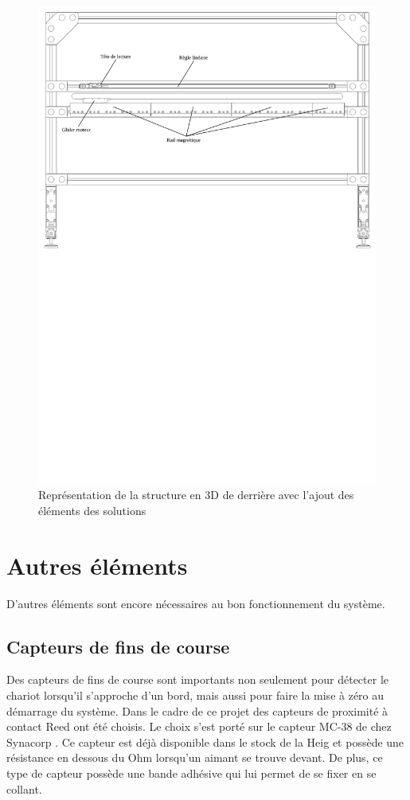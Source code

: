 \begin{figure}[H]
    \centering
    \includegraphics[width = \textwidth]{assets/figures/VueDerriere.svg}
    \caption{Représentation de la structure en 3D de derrière avec l'ajout des éléments des solutions}
    \label{fig:VueDerriere}
\end{figure}

\section{Autres éléments}\label{sec:AutreEle}
D'autres éléments sont encore nécessaires au bon fonctionnement du système.

\subsection{Capteurs de fins de course}
Des capteurs de fins de course sont importants non seulement pour détecter le chariot lorsqu'il s'approche d'un bord, mais aussi
pour faire la mise à zéro au démarrage du système. Dans le cadre de ce projet des capteurs de proximité à contact Reed ont été choisis.
Le choix s'est porté sur le capteur MC-38 de chez Synacorp \cite{Synacorp}. Ce capteur est déjà disponible dans le stock de la \acrshort{Heig}
et possède une résistance en dessous du Ohm lorsqu'un aimant se trouve devant. De plus, ce type de capteur possède une bande adhésive qui lui
permet de se fixer en se collant.

